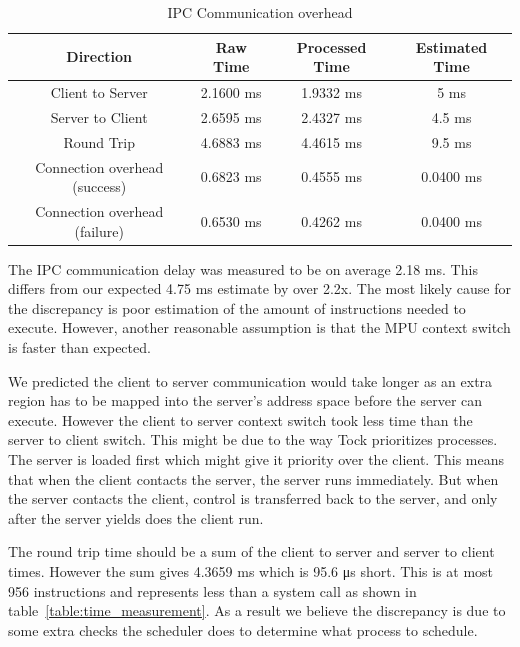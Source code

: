 \documentclass{article}
\begin{document}
\begin{table}[h!]
\centering
\begin{tabular}{|c||c|c|c|} 
 \hline
 Direction & Raw Time & Processed Time & Estimated Time \\ [0.5ex] 
 \hline\hline
 Client to Server & 2.1600 \si{\milli\second} & 1.9332 \si{\milli\second} & 5 \si{\milli\second} \\ 
 \hline
 Server to Client & 2.6595 \si{\milli\second} & 2.4327 \si{\milli\second} & 4.5 \si{\milli\second} \\
 \hline
 Round Trip & 4.6883 \si{\milli\second} & 4.4615 \si{\milli\second} & 9.5 \si{\milli\second} \\
 \hline
 Connection overhead (success) & 0.6823 \si{\milli\second} & 0.4555 \si{\milli\second} & 0.0400 \si{\milli\second} \\
 \hline
 Connection overhead (failure) & 0.6530 \si{\milli\second} & 0.4262 \si{\milli\second} & 0.0400 \si{\milli\second} \\[1ex] 
 \hline
\end{tabular}
\caption{IPC Communication overhead}
\label{table:ipc-overhead}
\end{table}

The IPC communication delay was measured to be on average 2.18 \si{\milli\second}. This differs from our expected 4.75 \si{\milli\second} estimate by over 2.2x. The most likely cause for the discrepancy is poor estimation of the amount of instructions needed to execute. However, another reasonable assumption is that the MPU context switch is faster than expected.

We predicted the client to server communication would take longer as an extra region has to be mapped into the server's address space before the server can execute. However the client to server context switch took less time than the server to client switch. This might be due to the way Tock prioritizes processes. The server is loaded first which might give it priority over the client. This means that when the client contacts the server, the server runs immediately. But when the server contacts the client, control is transferred back to the server, and only after the server yields does the client run.

The round trip time should be a sum of the client to server and server to client times. However the sum gives 4.3659 \si{\milli\second} which is 95.6 \si{\micro\second} short. This is at most 956 instructions\cite{ibex-pipeline} and represents less than a system call as shown in table~\ref{table:time_measurement}. As a result we believe the discrepancy is due to some extra checks the scheduler does to determine what process to schedule.
\end{document}
